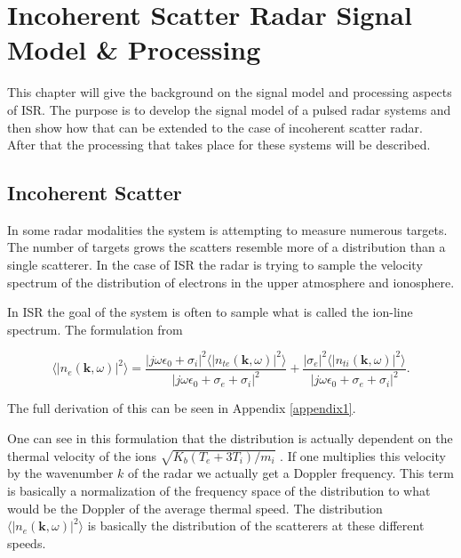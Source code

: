 \chapter{Incoherent Scatter Radar Signal Model \& Processing}
\label{chapter:isrproc}
\thispagestyle{myheadings}

\graphicspath{{2_ISRProc/Figures/}}


This chapter will give the background on the signal model and processing aspects of ISR. The purpose is to develop the signal model of a pulsed radar systems and then show how that can be extended to the case of incoherent scatter radar. After that the processing that takes place for these systems will be described. 

\section{Incoherent Scatter}


In some radar modalities the system is attempting to measure numerous targets.  The number of targets grows the scatters resemble more of a distribution than a single scatterer.  In the case of ISR the radar is trying to sample the velocity spectrum of the distribution of electrons in the upper atmosphere and ionosphere.  

In ISR the goal of the system is often to sample what is called the ion-line spectrum. The formulation from  \cite{kudeki:milla:1,kudeki:milla:2,Kudeki:2006kx}


\begin{equation}
\label{eq:mainspeceq:body}
\langle \left|n_e(\mathbf{k},\omega)\right|^2\rangle = \frac{|j\omega\epsilon_0 + \sigma_i|^2 \langle |n_{te}(\mathbf{k},\omega)|^2\rangle}{|j\omega\epsilon_0 +\sigma_e+\sigma_i|^2} + \frac{| \sigma_e|^2 \langle |n_{ti}(\mathbf{k},\omega)|^2\rangle}{|j\omega\epsilon_0 +\sigma_e+\sigma_i|^2}.
\end{equation}

\noindent The full derivation of this can be seen in Appendix \ref{appendix1}.


One can see in this formulation that the distribution is actually dependent on the thermal velocity of the ions $\sqrt{K_b(T_e+3T_i)/m_i}$ \cite{chen1984introduction}.  If one multiplies this velocity by the wavenumber $k$ of the radar we actually get a Doppler frequency.  This term is basically a normalization of the frequency space of the distribution to what would be the Doppler of the average thermal speed. The distribution $\langle \left|n_e(\mathbf{k},\omega)\right|^2\rangle $ is basically the distribution of the scatterers at these different speeds.


